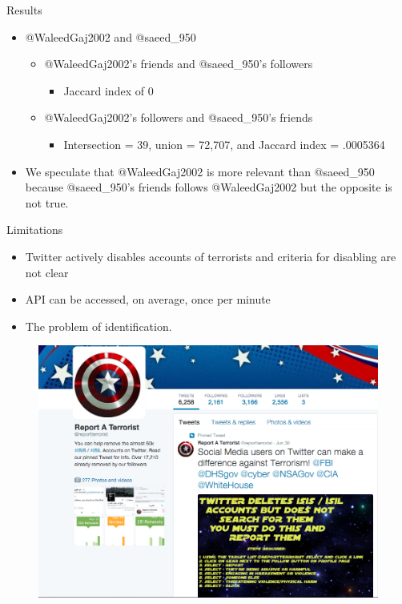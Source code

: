 \documentclass{beamer}
\begin{document}
\begin{frame}{Results}

\begin{itemize}
\item @WaleedGaj2002 and @saeed\_950
    \begin{itemize}
    \item @WaleedGaj2002's friends and @saeed\_950's followers
        \begin{itemize}
        \item Jaccard index of 0
        \end{itemize}
    \item @WaleedGaj2002's followers and @saeed\_950's friends
        \begin{itemize}
        \item Intersection = 39, union = 72,707, and Jaccard index = .0005364
        \end{itemize}
    \end{itemize}
\item We speculate that @WaleedGaj2002 is more relevant than @saeed\_950 because @saeed\_950's friends follows @WaleedGaj2002 but the opposite is not true.
\end{itemize}

\end{frame}

\begin{frame}{Limitations}
\begin{itemize}
\item Twitter actively disables accounts of terrorists and criteria for disabling are not clear
\item API can be accessed, on average, once per minute
\item The problem of identification. 
\end{itemize}
\begin{figure}
\centering
\includegraphics[width=1\textwidth]{picture1}
\end{figure}

\end{frame}
\end{document}
